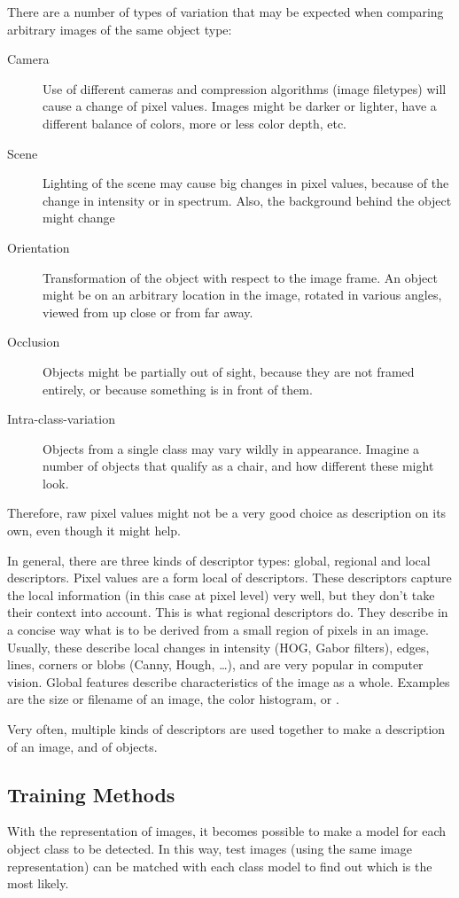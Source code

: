 \documentclass[a4paper,10pt]{article}
\begin{document}
There are a number of types of variation that may be expected when comparing arbitrary images of the same object type:
\begin{description}
    \item[Camera] Use of different cameras and compression algorithms (image filetypes) will cause a change of pixel values. Images might be darker or lighter, have a different balance of colors, more or less color depth, etc.
    \item[Scene] Lighting of the scene may cause big changes in pixel values, because of the change in intensity or in spectrum. Also, the background behind the object might change
    \item[Orientation] Transformation of the object with respect to the image frame. An object might be on an arbitrary location in the image, rotated in various angles, viewed from up close or from far away.
    \item[Occlusion] Objects might be partially out of sight, because they are not framed entirely, or because something is in front of them.
    \item[Intra-class-variation] Objects from a single class may vary wildly in appearance. Imagine a number of objects that qualify as a chair, and how different these might look.
\end{description}
Therefore, raw pixel values might not be a very good choice as description on its own, even though it might help.

In general, there are three kinds of descriptor types: global, regional and local descriptors. Pixel values are a form local of descriptors. These descriptors capture the local information (in this case at pixel level) very well, but they don't take their context into account. This is what regional descriptors do. They describe in a concise way what is to be derived from a small region of pixels in an image. Usually, these describe local changes in intensity (HOG, Gabor filters), edges, lines, corners or blobs (Canny, Hough, \ldots{}), and are very popular in computer vision. Global features describe characteristics of the image as a whole. Examples are the size or filename of an image, the color histogram, or .

Very often, multiple kinds of descriptors are used together to make a description of an image, and of objects.


\subsection{Training Methods} %
\label{sub:training_methods}
With the representation of images, it becomes possible to make a model for each object class to be detected. In this way, test images (using the same image representation) can be matched with each class model to find out which is the most likely.
\end{document}
